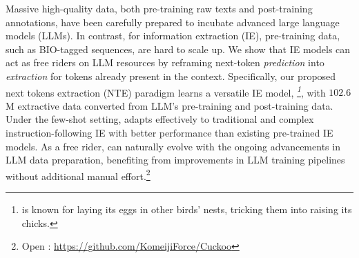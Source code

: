 Massive high-quality data, both pre-training raw texts and post-training annotations, have been carefully prepared to incubate advanced large language models (LLMs).
In contrast, for information extraction (IE), pre-training data, such as BIO-tagged sequences, are hard to scale up. 
We show that IE models can act as free riders on LLM resources by reframing next-token \emph{prediction} into \emph{extraction} for tokens already present in the context.
Specifically, our proposed next tokens extraction (NTE) paradigm learns a versatile IE model, \emph{\our\footnote{\our is known for laying its eggs in other birds’ nests, tricking them into raising its chicks.}}, with $102.6$M extractive data converted from LLM's pre-training and post-training data. 
Under the few-shot setting, \our adapts effectively to traditional and complex instruction-following IE with better performance than existing pre-trained IE models.
As a free rider, \our can naturally evolve with the ongoing advancements in LLM data preparation, benefiting from improvements in LLM training pipelines without additional manual effort.\footnote{Open \our: \href{https://github.com/KomeijiForce/Cuckoo}{https://github.com/KomeijiForce/Cuckoo}}
